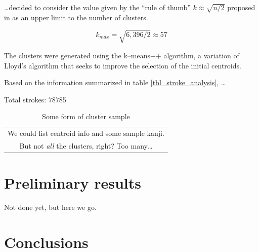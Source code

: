 \documentclass[10pt,conference,a4paper]{IEEEtran}
\begin{document}
	\ldots decided to consider the value given by the ``rule of thumb'' $k \approx \sqrt{n / 2}$ proposed in \cite{mardia2005multivariate}
	as an upper limit to the number of clusters.

	$$ k_{max} = \sqrt{6,396 / 2} \approx 57 $$

	The clusters were generated using the k--means++ algorithm,
	a variation of Lloyd's algorithm that seeks to improve the selection of the initial centroids. \cite{arthur2007k}

	Based on the information summarized in table \ref{tbl_stroke_analysis}, \ldots

	Total strokes: 78785

	\begin{table}
		\renewcommand{\arraystretch}{1.3}
		\caption{Some form of cluster sample}
		\label{tbl_sample_clusters}
		\centering
		\begin{tabular}{c}
			We could list centroid info and some sample kanji. \\
			But not \emph{all} the clusters, right? Too many\ldots \\
		\end{tabular}
	\end{table}





	\section{Preliminary results}
	\label{sec:experiment_results}

	Not done yet, but here we go.


	\section{Conclusions}
	\label{sec:conclusions}
\end{document}
